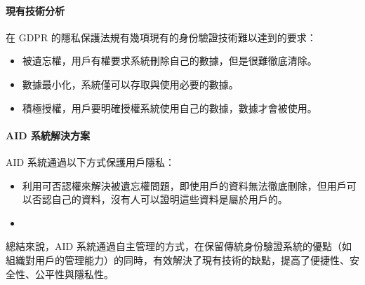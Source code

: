 \paragraph{現有技術分析}
在 GDPR 的隱私保護法規有幾項現有的身份驗證技術難以達到的要求：
\begin{itemize}
  \item 被遺忘權，用戶有權要求系統刪除自己的數據，但是很難徹底清除。
  \item 數據最小化，系統僅可以存取與使用必要的數據。
  \item 積極授權，用戶要明確授權系統使用自己的數據，數據才會被使用。
\end{itemize}

\paragraph{AID 系統解決方案}
AID 系統通過以下方式保護用戶隱私：
\begin{itemize}
  \item 利用可否認權來解決被遺忘權問題，即使用戶的資料無法徹底刪除，但用戶可以否認自己的資料，沒有人可以證明這些資料是屬於用戶的。
  \item
\end{itemize}

總結來說，AID 系統通過自主管理的方式，在保留傳統身份驗證系統的優點（如組織對用戶的管理能力）的同時，有效解決了現有技術的缺點，提高了便捷性、安全性、公平性與隱私性。
